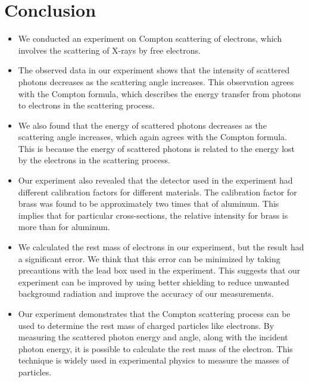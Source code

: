 \section{Conclusion}
	\begin{itemize}
		\item We conducted an experiment on Compton scattering of electrons, which involves the scattering of X-rays by free electrons.

		\item The observed data in our experiment shows that the intensity of scattered photons decreases as the scattering angle increases. This observation agrees with the Compton formula, which describes the energy transfer from photons to electrons in the scattering process.

		\item We also found that the energy of scattered photons decreases as the scattering angle increases, which again agrees with the Compton formula. This is because the energy of scattered photons is related to the energy lost by the electrons in the scattering process.

		\item Our experiment also revealed that the detector used in the experiment had different calibration factors for different materials. The calibration factor for brass was found to be approximately two times that of aluminum. This implies that for particular cross-sections, the relative intensity for brass is more than for aluminum.

		\item We calculated the rest mass of electrons in our experiment, but the result had a significant error. We think that this error can be minimized by taking precautions with the lead box used in the experiment. This suggests that our experiment can be improved by using better shielding to reduce unwanted background radiation and improve the accuracy of our measurements.

		\item Our experiment demonstrates that the Compton scattering process can be used to determine the rest mass of charged particles like electrons. By measuring the scattered photon energy and angle, along with the incident photon energy, it is possible to calculate the rest mass of the electron. This technique is widely used in experimental physics to measure the masses of particles.
	\end{itemize}
